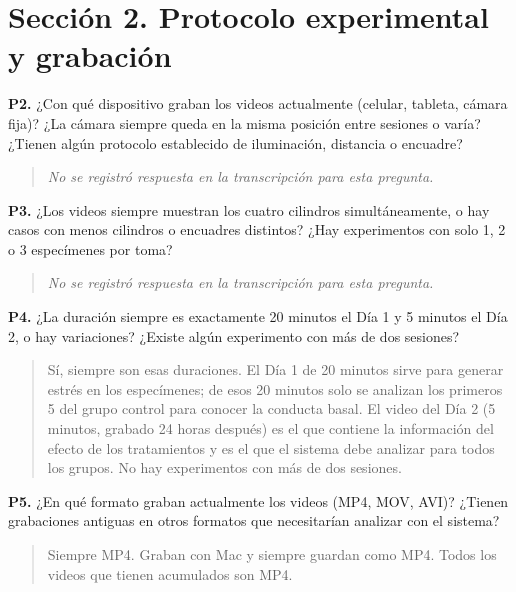 \section*{Sección 2. Protocolo experimental y grabación}

\textbf{P2.} ¿Con qué dispositivo graban los videos actualmente (celular, tableta,
cámara fija)? ¿La cámara siempre queda en la misma posición entre sesiones o varía?
¿Tienen algún protocolo establecido de iluminación, distancia o encuadre?

\begin{quote}
\textit{No se registró respuesta en la transcripción para esta pregunta.}
\end{quote}

\textbf{P3.} ¿Los videos siempre muestran los cuatro cilindros simultáneamente, o hay
casos con menos cilindros o encuadres distintos? ¿Hay experimentos con solo 1, 2 o 3
especímenes por toma?

\begin{quote}
\textit{No se registró respuesta en la transcripción para esta pregunta.}
\end{quote}

\textbf{P4.} ¿La duración siempre es exactamente 20 minutos el Día 1 y 5 minutos el
Día 2, o hay variaciones? ¿Existe algún experimento con más de dos sesiones?

\begin{quote}
Sí, siempre son esas duraciones. El Día 1 de 20 minutos sirve para generar estrés en
los especímenes; de esos 20 minutos solo se analizan los primeros 5 del grupo control
para conocer la conducta basal. El video del Día 2 (5 minutos, grabado 24 horas
después) es el que contiene la información del efecto de los tratamientos y es el que
el sistema debe analizar para todos los grupos. No hay experimentos con más de dos
sesiones.
\end{quote}

\textbf{P5.} ¿En qué formato graban actualmente los videos (MP4, MOV, AVI)? ¿Tienen
grabaciones antiguas en otros formatos que necesitarían analizar con el sistema?

\begin{quote}
Siempre MP4. Graban con Mac y siempre guardan como MP4. Todos los videos que tienen
acumulados son MP4.
\end{quote}


